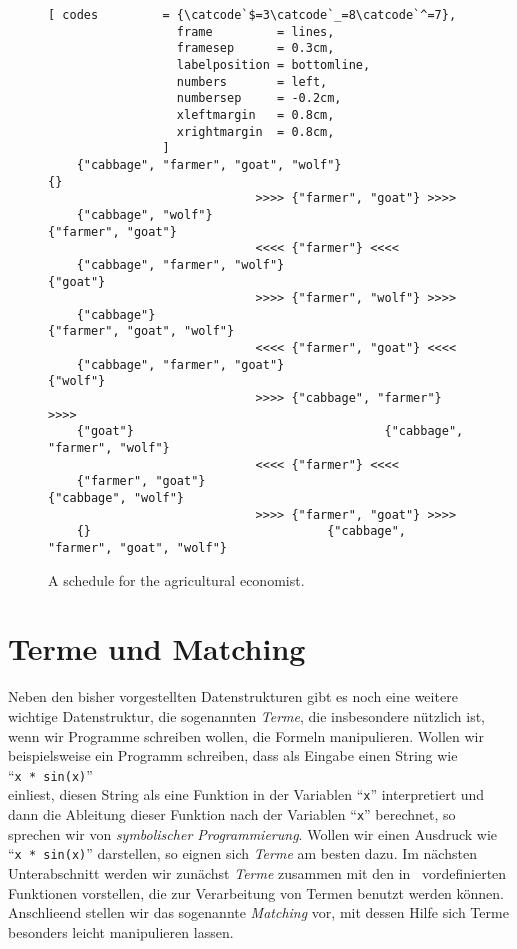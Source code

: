 \begin{figure}[!ht]
  \centering
\begin{Verbatim}[ codes         = {\catcode`$=3\catcode`_=8\catcode`^=7},
                  frame         = lines, 
                  framesep      = 0.3cm, 
                  labelposition = bottomline,
                  numbers       = left,
                  numbersep     = -0.2cm,
                  xleftmargin   = 0.8cm,
                  xrightmargin  = 0.8cm,
                ]
    {"cabbage", "farmer", "goat", "wolf"}                                 {}
                             >>>> {"farmer", "goat"} >>>> 
    {"cabbage", "wolf"}                                   {"farmer", "goat"}
                             <<<< {"farmer"} <<<< 
    {"cabbage", "farmer", "wolf"}                                   {"goat"}
                             >>>> {"farmer", "wolf"} >>>> 
    {"cabbage"}                                   {"farmer", "goat", "wolf"}
                             <<<< {"farmer", "goat"} <<<< 
    {"cabbage", "farmer", "goat"}                                   {"wolf"}
                             >>>> {"cabbage", "farmer"} >>>> 
    {"goat"}                                   {"cabbage", "farmer", "wolf"}
                             <<<< {"farmer"} <<<< 
    {"farmer", "goat"}                                   {"cabbage", "wolf"}
                             >>>> {"farmer", "goat"} >>>> 
    {}                                 {"cabbage", "farmer", "goat", "wolf"}
\end{Verbatim} 
\vspace*{-0.3cm}
\caption{A schedule for the agricultural economist.}  
\label{fig:wolf-ziege-solution}
\end{figure}


\section{Terme und Matching}
Neben den bisher vorgestellten Datenstrukturen gibt es noch eine weitere wichtige
Datenstruktur, die sogenannten \emph{Terme}, die insbesondere n\"{u}tzlich ist, wenn wir
Programme schreiben wollen, die Formeln manipulieren.  
Wollen wir beispielsweise ein Programm schreiben, dass als Eingabe einen String wie
\\[0.2cm]
\hspace*{1.3cm}
``\texttt{x * sin(x)}''
\\[0.2cm]
einliest, diesen String als eine Funktion in der Variablen ``\texttt{x}'' interpretiert
und dann die Ableitung dieser Funktion nach der Variablen ``\texttt{x}'' berechnet, so
sprechen wir von \emph{symbolischer Programmierung}.   Wollen wir einen Ausdruck wie 
``\texttt{x * sin(x)}'' darstellen, so eignen sich \emph{Terme} am besten dazu.
Im n\"{a}chsten Unterabschnitt werden wir zun\"{a}chst \emph{Terme} zusammen mit den in \setl\
vordefinierten Funktionen vorstellen, die zur Verarbeitung von Termen benutzt werden k\"{o}nnen.
Anschlie\3end stellen wir das sogenannte \emph{Matching} vor, mit dessen Hilfe sich Terme
besonders leicht manipulieren lassen.


